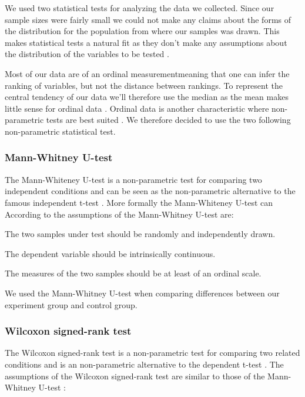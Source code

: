 We used two statistical tests for analyzing the data we collected.
Since our sample sizes were fairly small we could not make any claims
about the forms of the distribution for the \urort{} population
from where our samples was drawn.
This makes
 statistical tests a natural fit as they don't make any
assumptions about the distribution of the variables to be tested
\citep[]{siegel88}.

Most of our data are of an ordinal measurement\dash{}meaning that one can
infer the ranking of variables, but not the distance between rankings.
To represent the central tendency of our data we'll therefore use the median
as the mean makes little sense for ordinal data
\citep[]{siegel88}.
Ordinal data is another characteristic where non-parametric tests
are best suited \citep[]{siegel88}. We therefore decided
to use the two following non-parametric statistical test.

\subsubsection{Mann-Whitney U-test}

The Mann-Whiteney U-test is a non-parametric test for comparing two
independent conditions and can be seen as the non-parametric alternative to
the famous independent t-test \citep[]{field05}.
More formally the Mann-Whiteney U-test can
According to \citet[]{lowry08} the assumptions of the
Mann-Whitney U-test are:

\begin{enum}
  \item The two samples under test should be randomly and independently drawn.
  \item The dependent variable should be intrinsically continuous.
  \item The measures of the two samples should be at least of an ordinal scale.
\end{enum}

We used the Mann-Whitney U-test when comparing differences between our
experiment group and control group.

\subsubsection{Wilcoxon signed-rank test}

The Wilcoxon signed-rank test is a non-parametric test for comparing two
related conditions and is an non-parametric alternative to the
dependent t-test \citep[]{field05}.
The assumptions of the Wilcoxon signed-rank test are similar to those
of the Mann-Whitney U-test \citep[]{lowry08}:

